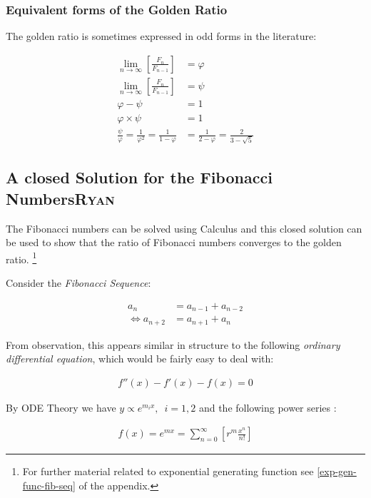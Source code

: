 \documentclass[a4paper,11pt,twoside]{article}
\begin{document}
\subsubsection{Equivalent forms of the Golden Ratio}
\label{sec:org55ea0e8}
The golden ratio is sometimes expressed in odd forms in the literature:


$$\begin{aligned}
\lim_{n     \rightarrow \infty }\left[ \frac{F_n}{F_{n- 1} }  \right] &= \varphi \\
\lim_{n     \rightarrow \infty }\left[ \frac{F_n}{F_{n- 1} }  \right] &= \psi \\
\varphi - \psi &=  1 \\
\varphi \times  \psi  &= 1 \\
\frac{\psi}{\varphi}  = \frac{1}{\varphi^2} = \frac{1}{1-\varphi} &= \frac{1}{2-\varphi} = \frac{2}{3 - \sqrt{5}  }
\end{aligned}$$
\subsection{A closed Solution for the Fibonacci Numbers\hfill{}\textsc{Ryan}}
\label{solving-the-sequence}
The Fibonacci numbers can be solved  using Calculus and this closed solution can be used to show that the ratio of Fibonacci numbers converges to the golden ratio. \footnote{For further material related to exponential generating function see \ref{exp-gen-func-fib-seq} of the appendix.}

Consider the \emph{Fibonacci Sequence}:


\begin{align}
    a_{n}&= a_{n - 1} + a_{n - 2} \nonumber \\
\iff a_{n+  2} &= a_{n+  1} +  a_n \label{eq:fib-def-shift}
\end{align}

From observation, this appears similar in structure to the following \emph{ordinary
differential equation}, which would be fairly easy to deal with:


\begin{align*}
f''\left( x \right)- f'\left( x \right)- f\left( x \right)=  0
\end{align*}

By ODE Theory we have \(y \propto e^{m_{i}x}, \enspace i = 1, 2\) \cite[\S 4.1.2]{zillDifferentialEquationsBoundaryvalue2009}
and the following power series \cite[\S 64]{churchillComplexVariablesApplications2014}:

\begin{align*}
f\left( x \right)= e^{mx} = \sum^{\infty}_{n= 0}   \left[ r^{m} \frac{x^n}{n!} \right]
\end{align*}
\end{document}
